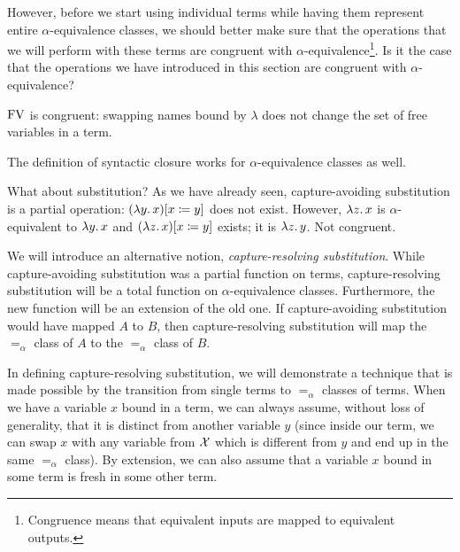 However, before we start using individual terms while having them represent
entire $\alpha$-equivalence classes, we should better make sure that the
operations that we will perform with these terms are congruent with
$\alpha$-equivalence\footnote{Congruence means that equivalent inputs are
  mapped to equivalent outputs.}. Is it the case that the operations we
have introduced in this section are congruent with $\alpha$-equivalence?

$\operatorname{FV}$ is congruent: swapping names bound by $\lambda$ does not change the
set of free variables in a term.

The definition of syntactic closure works for $\alpha$-equivalence classes
as well.

What about substitution? As we have already seen, capture-avoiding
substitution is a partial operation: $(\lambda y.\, x)[x \coloneqq y]$ does not
exist. However, $\lambda z.\, x$ is $\alpha$-equivalent to $\lambda y.\, x$ and
$(\lambda z.\, x)[x \coloneqq y]$ exists; it is $\lambda z.\, y$. Not congruent.

We will introduce an alternative notion, \emph{capture-resolving
  substitution}. While capture-avoiding substitution was a partial function
on terms, capture-resolving substitution will be a total function on
$\alpha$-equivalence classes. Furthermore, the new function will be an
extension of the old one. If capture-avoiding substitution would have
mapped $A$ to $B$, then capture-resolving substitution will map the
$=_\alpha$ class of $A$ to the $=_\alpha$ class of $B$.

In defining capture-resolving substitution, we will demonstrate a technique
that is made possible by the transition from single terms to $=_\alpha$
classes of terms. When we have a variable $x$ bound in a term, we can
always assume, without loss of generality, that it is distinct from another
variable $y$ (since inside our term, we can swap $x$ with any variable from
$\mathcal{X}$ which is different from $y$ and end up in the same $=_\alpha$
class). By extension, we can also assume that a variable $x$ bound in some
term is fresh in some other term.

